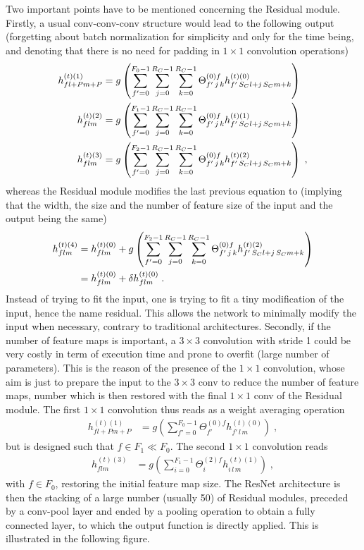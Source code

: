 \vspace{0.2cm}

Two important points have to be mentioned concerning the Residual module. Firstly, a usual conv-conv-conv structure would lead to the following output (forgetting about batch normalization for simplicity and only for the time being, and denoting that there is no need for padding in $1\times 1$ convolution operations)
\begin{align}
h^{(t)(1)}_{fl+Pm+P}&=
%
g\left(\sum^{F_0-1}_{f'=0}\sum^{R_C-1}_{j=0}\sum^{R_C-1}_{k=0}
%
\Theta^{(0)f}_{f'\,j\,k}h^{(t)(0)}_{f'\,S_Cl+j\,S_Cm+k}\right)\notag\\
%
h^{(t)(2)}_{flm}&=
%
g\left(\sum^{F_1-1}_{f'=0}\sum^{R_C-1}_{j=0}\sum^{R_C-1}_{k=0}
%
\Theta^{(0)f}_{f'\,j\,k}h^{(t)(1)}_{f'\,S_Cl+j\,S_Cm+k}\right)\notag\\
%
h^{(t)(3)}_{flm}&=
%
g\left(\sum^{F_2-1}_{f'=0}\sum^{R_C-1}_{j=0}\sum^{R_C-1}_{k=0}
%
\Theta^{(0)f}_{f'\,j\,k}h^{(t)(2)}_{f'\,S_Cl+j\,S_Cm+k}\right)\;,
\end{align}
whereas the Residual module modifies the last previous equation to (implying that the width, the size and the number of feature size of the input and the output being the same)
\begin{align}
h^{(t)(4)}_{flm}&=h^{(t)(0)}_{flm}+g\left(
%
\sum^{F_2-1}_{f'=0}\sum^{R_C-1}_{j=0}\sum^{R_C-1}_{k=0}
%
\Theta^{(0)f}_{f'\,j\,k}h^{(t)(2)}_{f'\,S_Cl+j\,S_Cm+k}\right)\notag\\
%
&=h^{(t)(0)}_{flm}+\delta h^{(t)(0)}_{flm}\;.
\end{align}
Instead of trying to fit the input, one is trying to fit a tiny modification of the input, hence the name residual. This allows the network to minimally modify the input when necessary, contrary to traditional architectures. Secondly, if the number of feature maps is important, a $3\times 3$ convolution with stride 1 could be very costly in term of execution time and prone to overfit (large number of parameters). This is the reason of the presence of the $1 \times 1$ convolution, whose aim is just to prepare the input to the $3\times 3$ conv to reduce the number of feature maps, number which is then restored with the final $1\times 1$ conv of the Residual module. The first $1\times 1$ convolution thus reads as a weight averaging operation
\begin{align}
h^{(t)(1)}_{fl+Pm+P}&=
%
g\left(\sum^{F_0-1}_{f'=0}
%
\Theta^{(0)f}_{f'}h^{(t)(0)}_{f'\,l\,m}\right)\;,
\end{align}
but is designed such that $f\in F_1\ll F_0$. The second $1\times 1$ convolution reads
\begin{align}
h^{(t)(3)}_{flm}&=g\left(\sum^{F_1-1}_{i=0}\Theta^{(2)f}_{i}h^{(t)(1)}_{i\,l\,m}\right)\;,
\end{align}
with $f \in F_0$, restoring the initial feature map size. The ResNet architecture is then the stacking of a large number (usually 50) of Residual modules, preceded by a conv-pool layer and ended by a pooling operation to obtain a fully connected layer, to which the output function is directly applied. This is illustrated in the following figure.




